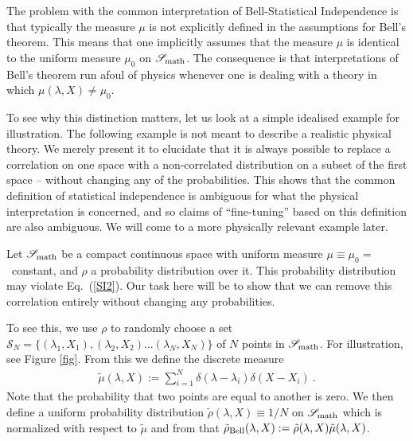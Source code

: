 \documentclass[12pt]{article}
\begin{document}
The problem with the common interpretation of Bell-Statistical Independence is that typically the measure $\mu$ is not explicitly defined in the assumptions for Bell's theorem. This means that one implicitly assumes that the measure $\mu$ is identical to the uniform measure $\mu_0$ on ${\mathscr S}_{\rm math}$. The consequence is that interpretations of Bell's theorem run afoul of physics whenever one is dealing with a theory in which $\mu(\lambda,X) \ne \mu_0$.

To see why this distinction matters, let us look at a simple idealised example for illustration. The following example is not meant to describe a realistic physical theory. We merely present it to elucidate that it is always possible to replace a correlation on one space with a non-correlated distribution on a subset of the first space -- without changing any of the probabilities. This shows that the common definition of statistical independence is ambiguous for what the physical interpretation is concerned, and so claims of ``fine-tuning'' based on this definition are also ambiguous. We will come to a more physically relevant example later. 

Let ${\mathscr S}_{\rm math}$ be a compact continuous space with uniform measure $\mu \equiv \mu_0 =$~constant, and $\rho$ a probability distribution over it. This probability distribution may violate Eq.\ (\ref{SI2}). Our task here will be to show that we can remove this correlation entirely without changing any probabilities. 

To see this, we use $\rho$ to randomly choose a set ${\mathscr S}_N = \{ (\lambda_1,X_1),(\lambda_2,X_2)...(\lambda_N,X_N)\}$ of $N$ points in ${\mathscr S}_{\rm math}$. For illustration, see Figure \ref{fig}. From this we define the discrete measure
\begin{eqnarray}
\tilde \mu(\lambda,X) := \sum_{i=1}^N \delta(\lambda - \lambda_i) \delta(X-X_i)~.
\end{eqnarray}
Note that the probability that two points are equal to another is zero.
We then define a uniform probability distribution $\tilde \rho(\lambda,X) \equiv 1/N$ on ${\mathscr S}_{\rm math}$ which is normalized with respect to $\tilde \mu$ and from that $\tilde \rho_{\rm Bell}(\lambda,X):= \tilde \rho(\lambda,X) \tilde \mu(\lambda,X)$.
\end{document}
